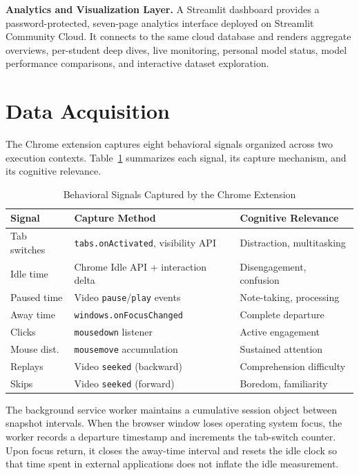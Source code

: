 \documentclass[conference]{IEEEtran}
\begin{document}
\textbf{Analytics and Visualization Layer.} A Streamlit dashboard provides a password-protected, seven-page analytics interface deployed on Streamlit Community Cloud. It connects to the same cloud database and renders aggregate overviews, per-student deep dives, live monitoring, personal model status, model performance comparisons, and interactive dataset exploration.

\section{Data Acquisition}

The Chrome extension captures eight behavioral signals organized across two execution contexts. Table~\ref{tab:signals} summarizes each signal, its capture mechanism, and its cognitive relevance.

\begin{table}[h]
\caption{Behavioral Signals Captured by the Chrome Extension}
\label{tab:signals}
\centering
\small
\begin{tabular}{@{}p{1.6cm}p{2.8cm}p{2.8cm}@{}}
\toprule
\textbf{Signal} & \textbf{Capture Method} & \textbf{Cognitive Relevance} \\
\midrule
Tab switches & \texttt{tabs.onActivated}, visibility API & Distraction, multitasking \\
Idle time & Chrome Idle API + interaction delta & Disengagement, confusion \\
Paused time & Video \texttt{pause}/\texttt{play} events & Note-taking, processing \\
Away time & \texttt{windows.onFocusChanged} & Complete departure \\
Clicks & \texttt{mousedown} listener & Active engagement \\
Mouse dist. & \texttt{mousemove} accumulation & Sustained attention \\
Replays & Video \texttt{seeked} (backward) & Comprehension difficulty \\
Skips & Video \texttt{seeked} (forward) & Boredom, familiarity \\
\bottomrule
\end{tabular}
\end{table}

The background service worker maintains a cumulative session object between snapshot intervals. When the browser window loses operating system focus, the worker records a departure timestamp and increments the tab-switch counter. Upon focus return, it closes the away-time interval and resets the idle clock so that time spent in external applications does not inflate the idle measurement.
\end{document}
